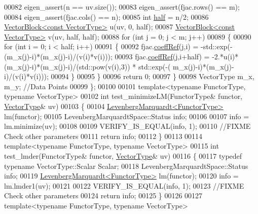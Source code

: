 \begin{DoxyCode}
00082     eigen\_assert(n == uv.size());
00083     eigen\_assert(fjac.rows() == m);
00084     eigen\_assert(fjac.cols() == n);
00085     \textcolor{keywordtype}{int} \hyperlink{struct_eigen_1_1half}{half} = n/2;
00086     \hyperlink{group___core___module_class_eigen_1_1_vector_block}{VectorBlock<const VectorType>} u(uv, 0, half);
00087     \hyperlink{group___core___module_class_eigen_1_1_vector_block}{VectorBlock<const VectorType>} v(uv, half, half);
00088     \textcolor{keywordflow}{for} (\textcolor{keywordtype}{int} j = 0; j < m; j++)
00089     \{
00090       \textcolor{keywordflow}{for} (\textcolor{keywordtype}{int} i = 0; i < half; i++)
00091       \{
00092         fjac.\hyperlink{class_eigen_1_1_plain_object_base_a25626a55b26a4323565f79d1b7c48ea8}{coeffRef}(j,i) = -std::exp(-(m\_x(j)-i)*(m\_x(j)-i)/(v(i)*v(i)));
00093         fjac.\hyperlink{class_eigen_1_1_plain_object_base_a25626a55b26a4323565f79d1b7c48ea8}{coeffRef}(j,i+half) = -2.*u(i)*(m\_x(j)-i)*(m\_x(j)-i)/(std::pow(v(i),3)) * std::exp(-(
      m\_x(j)-i)*(m\_x(j)-i)/(v(i)*v(i)));
00094       \}
00095     \}
00096     \textcolor{keywordflow}{return} 0;
00097   \}
00098   VectorType m\_x, m\_y; \textcolor{comment}{//Data Points}
00099 \};
00100 
00101 \textcolor{keyword}{template}<\textcolor{keyword}{typename} FunctorType, \textcolor{keyword}{typename} VectorType>
00102 \textcolor{keywordtype}{int} test\_minimizeLM(FunctorType& functor, \hyperlink{group___core___module}{VectorType}& uv)
00103 \{
00104   \hyperlink{class_eigen_1_1_levenberg_marquardt}{LevenbergMarquardt<FunctorType>} lm(functor);
00105   LevenbergMarquardtSpace::Status info; 
00106   
00107   info = lm.minimize(uv);
00108   
00109   VERIFY\_IS\_EQUAL(info, 1);
00110   \textcolor{comment}{//FIXME Check other parameters}
00111   \textcolor{keywordflow}{return} info;
00112 \}
00113 
00114 \textcolor{keyword}{template}<\textcolor{keyword}{typename} FunctorType, \textcolor{keyword}{typename} VectorType>
00115 \textcolor{keywordtype}{int} test\_lmder(FunctorType& functor, \hyperlink{group___core___module}{VectorType}& uv)
00116 \{
00117   \textcolor{keyword}{typedef} \textcolor{keyword}{typename} VectorType::Scalar Scalar;
00118   LevenbergMarquardtSpace::Status info; 
00119   \hyperlink{class_eigen_1_1_levenberg_marquardt}{LevenbergMarquardt<FunctorType>} lm(functor);
00120   info = lm.lmder1(uv);
00121   
00122   VERIFY\_IS\_EQUAL(info, 1);
00123   \textcolor{comment}{//FIXME Check other parameters}
00124   \textcolor{keywordflow}{return} info;
00125 \}
00126 
00127 \textcolor{keyword}{template}<\textcolor{keyword}{typename} FunctorType, \textcolor{keyword}{typename} VectorType>

\end{DoxyCode}
